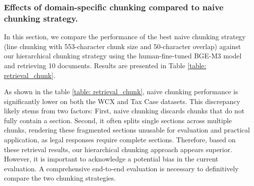 \subsubsection{Effects of domain-specific chunking compared to naive chunking strategy.}
\label{subsubsec:re_result_chunk}

In this section, we compare the performance of the best naive chunking strategy (line chunking with 553-character chunk size and 50-character overlap) against our hierarchical chunking strategy using the human-fine-tuned BGE-M3 model and retrieving 10 documents. Results are presented in Table \ref{table: retrieval_chunk}.

As shown in the table \ref{table: retrieval_chunk}, naive chunking performance is significantly lower on both the WCX and Tax Case datasets. This discrepancy likely stems from two factors: First, naive chunking discards chunks that do not fully contain a section. Second, it often splits single sections across multiple chunks, rendering these fragmented sections unusable for evaluation and practical application, as legal responses require complete sections. Therefore, based on these retrieval results, our hierarchical chunking approach appears superior. However, it is important to acknowledge a potential bias in the current evaluation. A comprehensive end-to-end evaluation is necessary to definitively compare the two chunking strategies.

